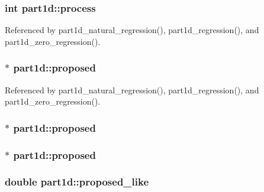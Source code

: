 \subsubsection[{\texorpdfstring{process}{process}}]{\setlength{\rightskip}{0pt plus 5cm}int part1d\+::process}\hypertarget{structpart1d_af8c16d340145531dd5395514ec97a064}{}\label{structpart1d_af8c16d340145531dd5395514ec97a064}


Referenced by part1d\+\_\+natural\+\_\+regression(), part1d\+\_\+regression(), and part1d\+\_\+zero\+\_\+regression().

\subsubsection[{\texorpdfstring{proposed}{proposed}}]{$\ast$ part1d\+::proposed}\hypertarget{structpart1d_aea5862ff7193ba1ad85ce8e6337fa27c}{}\label{structpart1d_aea5862ff7193ba1ad85ce8e6337fa27c}


Referenced by part1d\+\_\+natural\+\_\+regression(), part1d\+\_\+regression(), and part1d\+\_\+zero\+\_\+regression().

\subsubsection[{\texorpdfstring{proposed}{proposed}}]{$\ast$ part1d\+::proposed}\hypertarget{structpart1d_aa2cdbab752ff56e0bd1e09b7ce150f04}{}\label{structpart1d_aa2cdbab752ff56e0bd1e09b7ce150f04}
\subsubsection[{\texorpdfstring{proposed}{proposed}}]{$\ast$ part1d\+::proposed}\hypertarget{structpart1d_a8db6c3fe4b4287d1e485d3f10b63169e}{}\label{structpart1d_a8db6c3fe4b4287d1e485d3f10b63169e}
\subsubsection[{\texorpdfstring{proposed\+\_\+like}{proposed_like}}]{\setlength{\rightskip}{0pt plus 5cm}double part1d\+::proposed\+\_\+like}\hypertarget{structpart1d_a06b783dcb2ee38b655fe4436149fbd62}{}\label{structpart1d_a06b783dcb2ee38b655fe4436149fbd62}



